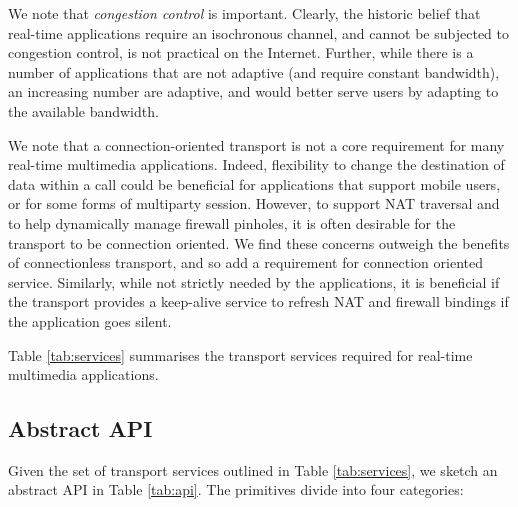 \documentclass{sig-alternate-05-2015}
\begin{document}
We note that \emph{congestion control} is important. Clearly, the historic
belief that real-time applications require an isochronous channel, and
cannot be subjected to congestion control, is not practical on the
Internet. Further, while there is a number of applications that are not
adaptive (and require constant bandwidth), an increasing number are
adaptive, and would better serve users by adapting to the available
bandwidth.

We note that a connection-oriented transport is not a core requirement for
many real-time multimedia applications.  Indeed, flexibility to change the
destination of data within a call could be beneficial for applications that
support mobile users, or for some forms of multiparty session. However, to
support NAT traversal and to help dynamically manage firewall pinholes, it
is often desirable for the transport to be connection oriented. We find
these concerns outweigh the benefits of connectionless transport, and so
add a requirement for connection oriented service. 
Similarly, while not strictly needed by the applications, it is beneficial
if the transport provides a keep-alive service to refresh NAT and firewall
bindings if the application goes silent. 

Table \ref{tab:services} summarises the transport services required for
real-time multimedia applications. 

\subsection{Abstract API}

Given the set of transport services outlined in Table \ref{tab:services}, 
we sketch an abstract API in  Table \ref{tab:api}. The primitives divide
into four categories:
\end{document}
